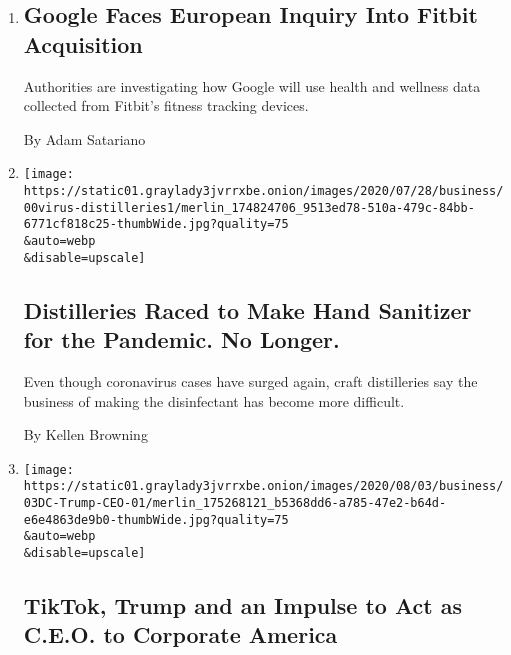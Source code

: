 \begin{enumerate}
\def\labelenumi{\arabic{enumi}.}
\item
  \href{/2020/08/04/business/google-fitbit-europe.html}{}

  \hypertarget{google-faces-european-inquiry-into-fitbit-acquisition}{%
  \subsection{Google Faces European Inquiry Into Fitbit
  Acquisition}\label{google-faces-european-inquiry-into-fitbit-acquisition}}

  Authorities are investigating how Google will use health and wellness
  data collected from Fitbit's fitness tracking devices.

  By Adam Satariano
\item
  \href{/2020/08/04/business/distilleries-hand-sanitizer-pandemic.html}{}

  \texttt{[image: https://static01.graylady3jvrrxbe.onion/images/2020/07/28/business/00virus-distilleries1/merlin\_174824706\_9513ed78-510a-479c-84bb-6771cf818c25-thumbWide.jpg?quality=75\\\&auto=webp\\\&disable=upscale]}

  \hypertarget{distilleries-raced-to-make-hand-sanitizer-for-the-pandemic-no-longer}{%
  \subsection{Distilleries Raced to Make Hand Sanitizer for the
  Pandemic. No
  Longer.}\label{distilleries-raced-to-make-hand-sanitizer-for-the-pandemic-no-longer}}

  Even though coronavirus cases have surged again, craft distilleries
  say the business of making the disinfectant has become more difficult.

  By Kellen Browning
\item
  \href{/2020/08/03/business/economy/trump-tiktok-china-business.html}{}

  \texttt{[image: https://static01.graylady3jvrrxbe.onion/images/2020/08/03/business/03DC-Trump-CEO-01/merlin\_175268121\_b5368dd6-a785-47e2-b64d-e6e4863de9b0-thumbWide.jpg?quality=75\\\&auto=webp\\\&disable=upscale]}

  \hypertarget{tiktok-trump-and-an-impulse-to-act-as-ceo-to-corporate-america}{%
  \subsection{TikTok, Trump and an Impulse to Act as C.E.O. to Corporate
  America}\label{tiktok-trump-and-an-impulse-to-act-as-ceo-to-corporate-america}}


\end{enumerate}

